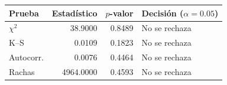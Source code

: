 \begin{tabular}{lrrl}
\toprule
Prueba & Estadístico & $p$-valor & Decisión ($\alpha=0.05$) \\
\midrule
$\chi^2$ & 38.9000 & 0.8489 & No se rechaza \\
K--S & 0.0109 & 0.1823 & No se rechaza \\
Autocorr. & 0.0076 & 0.4464 & No se rechaza \\
Rachas & 4964.0000 & 0.4593 & No se rechaza \\
\bottomrule
\end{tabular}
